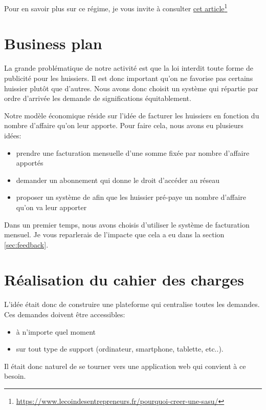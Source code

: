 \documentclass[]{report}
\newcommand\fnurl[2]{%
  \href{#1}{#2}\footnote{\url{#1}}%
}
\begin{document}
    Pour en savoir plus sur ce régime, je vous invite à consulter \fnurl{https://www.lecoindesentrepreneurs.fr/pourquoi-creer-une-sasu/}{cet article}

  \section{Business plan}

    La grande problématique de notre activité est que la loi interdit toute forme de publicité pour les huissiers. Il est donc important qu'on ne favorise pas certains huissier plutôt que d'autres. Nous avons donc choisit un système qui répartie par ordre d'arrivée les demande de significations équitablement.

    Notre modèle économique réside sur l'idée de facturer les huissiers en fonction du nombre d'affaire qu'on leur apporte. Pour faire cela, nous avons eu plusieurs idées:

    \begin{itemize}
      \item prendre une facturation mensuelle d'une somme fixée par nombre d'affaire apportés
      \item demander un abonnement qui donne le droit d'accéder au réseau
      \item proposer un système de  afin que les huissier pré-paye un nombre d'affaire qu'on va leur apporter
    \end{itemize}

    Dans un premier temps, nous avons choisis d'utiliser le système de facturation mensuel. Je vous reparlerais de l'impacte que cela a eu dans la section \ref{sec:feedback}.


  \section{Réalisation du cahier des charges}

    L'idée était donc de construire une plateforme qui centralise toutes les demandes. Ces demandes doivent être accessibles:

    \begin{itemize}
      \item à n'importe quel moment
      \item sur tout type de support (ordinateur, smartphone, tablette, etc..).
    \end{itemize}

    Il était donc naturel de se tourner vers une application web qui convient à ce besoin.
\end{document}
